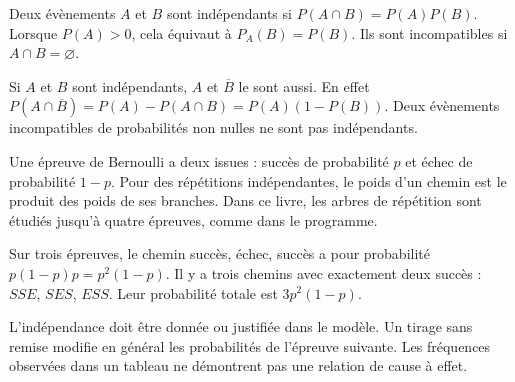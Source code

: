 \clearpage
{}
\begin{definition}
Deux évènements $A$ et $B$ sont indépendants si $P(A\cap B)=P(A)P(B)$.
Lorsque $P(A)>0$, cela équivaut à $P_A(B)=P(B)$.
Ils sont incompatibles si $A\cap B=\varnothing$.
\end{definition}
\begin{propriete}
Si $A$ et $B$ sont indépendants, $A$ et $\overline B$ le sont aussi.
En effet $P(A\cap\overline B)=P(A)-P(A\cap B)=P(A)(1-P(B))$.
Deux évènements incompatibles de probabilités non nulles ne sont pas indépendants.
\end{propriete}
\begin{definition}
Une épreuve de Bernoulli a deux issues : succès de probabilité $p$ et échec
de probabilité $1-p$. Pour des répétitions indépendantes, le poids d'un chemin
est le produit des poids de ses branches. Dans ce livre, les arbres de
répétition sont étudiés jusqu'à quatre épreuves, comme dans le programme.
\end{definition}
\begin{exemple}
Sur trois épreuves, le chemin succès, échec, succès a pour probabilité
$p(1-p)p=p^2(1-p)$. Il y a trois chemins avec exactement deux succès :
$SSE$, $SES$, $ESS$. Leur probabilité totale est $3p^2(1-p)$.
\end{exemple}
\begin{attention}
L'indépendance doit être donnée ou justifiée dans le modèle. Un tirage sans
remise modifie en général les probabilités de l'épreuve suivante.
Les fréquences observées dans un tableau ne démontrent pas une relation de cause à effet.
\end{attention}

\exercices


